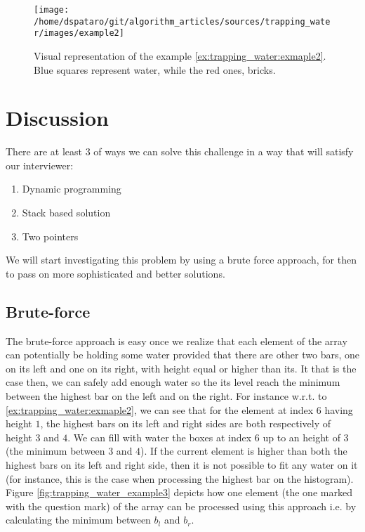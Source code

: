 \begin{figure}
		\label{fig:trapping_water_example2}
		\centering
		\texttt{[image: /home/dspataro/git/algorithm\_articles/sources/trapping\_water/images/example2]}
		\caption{Visual representation of the example \ref{ex:trapping_water:exmaple2}. Blue squares represent water, while the red ones, bricks.}
\end{figure}

%
%	

\section{Discussion}
\label{trapping_water:sec:discussion}
There are at least $3$ of ways we can solve this challenge in a way that will satisfy our interviewer:

\begin{enumerate}
	\item Dynamic programming
	\item Stack based solution
	\item Two pointers
\end{enumerate}
We will start investigating this problem by using a brute force approach, for then to pass on more sophisticated and better solutions.


\subsection{Brute-force}
\label{trapping_water:sec:bruteforce}

The brute-force approach is easy once we realize that each element of the array can potentially be holding some water provided that there are other two bars, one on its left and one on its right, with height equal or higher than its. It that is the case then, we can safely add enough water so the its level reach the minimum between the highest bar on the left and on the right.
For instance w.r.t. to \ref{ex:trapping_water:exmaple2}, we can see that for the element at index $6$ having height $1$, the highest bars on its left and right sides are both respectively of height $3$ and $4$. We can fill with water the boxes at index $6$ up to an height of $3$ (the minimum between $3$ and $4$).
If the current element is higher than both the highest bars on its left and right side, then it is not possible to fit any water on it (for instance, this is the case when processing the highest bar on the histogram).  Figure \ref{fig:trapping_water_example3} depicts how one element (the one marked with the question mark) of the array can be processed using this approach i.e. by calculating the minimum between $b_l$ and $b_r$.


